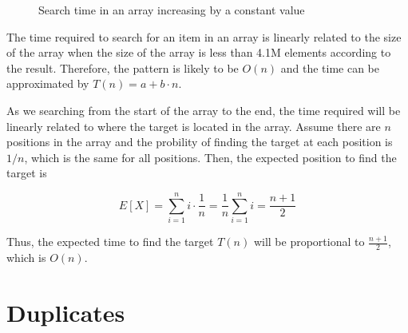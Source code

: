 \documentclass[a4paper,11pt]{article}
\begin{document}
\begin{figure}[H]
  \centering
  \caption{Search time in an array increasing by a constant value}
  \label{fig:search_v2}
\end{figure}

The time required to search for an item in an array is linearly related to the size of the array when
the size of the array is less than 4.1M elements according to the result. Therefore, the pattern is likely to be $O(n)$ and
the time can be approximated by $T(n) = a + b \cdot n$.

As we searching from the start of the array to the end, the time required will be linearly related to
where the target is located in the array.
Assume there are $n$ positions in the array and the probility of finding the target at each position
is $1/n$, which is the same for all positions. Then, the expected position to find the target is

\begin{equation}		
  E[X] = \sum_{i=1}^{n} i \cdot \frac{1}{n} = \frac{1}{n} \sum_{i=1}^{n} i = \frac{n+1}{2}
\end{equation}

Thus, the expected time to find the target $T(n)$ will be proportional to $\frac{n+1}{2}$, 
which is $O(n)$.

\section*{Duplicates}
\end{document}
